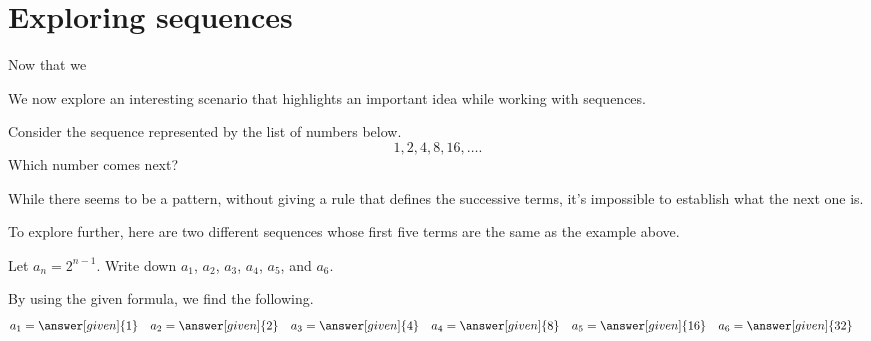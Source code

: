 \documentclass{ximera}
\begin{document}
\section{Exploring sequences}
Now that we 

We now explore an interesting scenario that highlights an important idea while working with sequences.

\begin{question}
  Consider the sequence represented by the list of numbers below.
  \[
  1, 2, 4, 8, 16, \dots.
  \]
Which number comes next? 

While there seems to be a pattern, without giving a rule that defines the successive terms, it's impossible to establish what the next one is. 

\end{question}

To explore further, here are two different sequences whose first five terms are the same as the example above.

\begin{example}
  Let $a_n = 2^{n-1}$.  Write down $a_1$, $a_2$, $a_3$, $a_4$, $a_5$, and
  $a_6$.
  \begin{explanation}
    By using the given formula, we find the following.
    \begin{align*}
      a_1 &= \answer[given]{1} & a_2 &= \answer[given]{2} & 
      a_3 &= \answer[given]{4} & 
      a_4 &= \answer[given]{8} & 
      a_5 &= \answer[given]{16} & 
      a_6 &= \answer[given]{32}
    \end{align*}
  \end{explanation}
\end{example}
\end{document}
